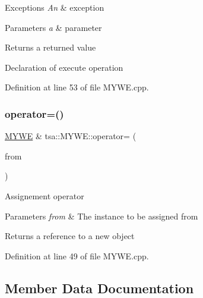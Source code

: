 \begin{DoxyExceptions}{Exceptions}
{\em An} & exception\\
\hline
\end{DoxyExceptions}

\begin{DoxyParams}{Parameters}
{\em a} & parameter\\
\hline
\end{DoxyParams}
\begin{DoxyReturn}{Returns}
a returned value
\end{DoxyReturn}
Declaration of execute operation 

Definition at line 53 of file M\+Y\+W\+E.\+cpp.

\mbox{\label{classtsa_1_1_m_y_w_e_aaa9191158d3202f9e4e734724e9eaf98}} 
\subsubsection{\texorpdfstring{operator=()}{operator=()}}
{\footnotesize\ttfamily \hyperlink{classtsa_1_1_m_y_w_e}{M\+Y\+WE} \& tsa\+::\+M\+Y\+W\+E\+::operator= (\begin{DoxyParamCaption}\item[{const \hyperlink{classtsa_1_1_m_y_w_e}{M\+Y\+WE} \&}]{from }\end{DoxyParamCaption})}

Assignement operator


\begin{DoxyParams}{Parameters}
{\em from} & The instance to be assigned from\\
\hline
\end{DoxyParams}
\begin{DoxyReturn}{Returns}
a reference to a new object 
\end{DoxyReturn}


Definition at line 49 of file M\+Y\+W\+E.\+cpp.



\subsection{Member Data Documentation}
\mbox{\label{classtsa_1_1_m_y_w_e_ad2fe73259b41c43616a5e950ae280547}} 
